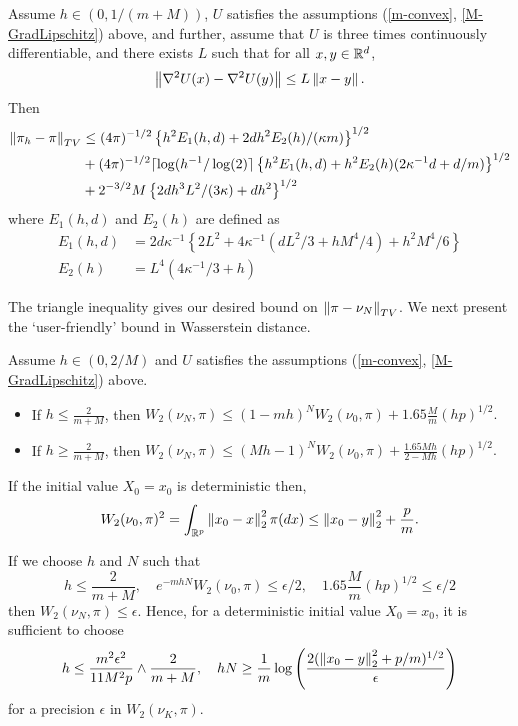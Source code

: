 \begin{theorem}
    Assume $h \in (0, 1/(m+M))$, $U$ satisfies the assumptions (\ref{m-convex}, \ref{M-GradLipschitz}) above, and further, assume that $U$ is three times continuously differentiable, and there exists $L$ such that for all $x,y \in \mathbb{R}^d$,
    $$
    \norm{\grad^2 U(x) - \grad^2 U(y)} \leq L \norm{x-y}.
    $$
    Then
    \begin{align*}
        \norm{\pi_h - \pi}_{TV} &\leq (4 \pi)^{-1/2} \left\{ h^2 E_1(h, d) + 2dh^2 E_2(h)/(\kappa m)\right\}^{1/2}\\
        &+ (4 \pi)^{-1/2} \lceil \log(h^{-1}/\log(2) \rceil \left\{ h^2 E_1(h,d) + h^2 E_2(h)(2 \kappa^{-1}d + d/m) \right\}^{1/2}\\
        &+ 2^{-3/2} M \left\{ 2d h^3 L^2/(3\kappa) + dh^2\right\}^{1/2}
    \end{align*}
    where $E_1(h,d)$ and $E_2(h)$ are defined as
    \begin{align*}
        E_1(h,d) &= 2 d \kappa^{-1} \left\{2L^2 + 4 \kappa^{-1} (dL^2/3 + h M^4 /4) + h^2 M^4/6 \right\}\\
        E_2(h) &= L^4(4\kappa^{-1}/3 + h)
    \end{align*}
\end{theorem}

The triangle inequality gives our desired bound on $\norm{\pi - \nu_N}_{TV}$.  We next present the `user-friendly' bound in Wasserstein distance.

\begin{theorem}
    Assume $h \in (0, 2/M)$ and $U$ satisfies the assumptions (\ref{m-convex}, \ref{M-GradLipschitz}) above. 
    \begin{itemize}
        \item If $h \leq \frac{2}{m+M}$, then $W_2(\nu_N, \pi) \leq (1-mh)^N W_2(\nu_0, \pi) + 1.65 \frac{M}{m}(hp)^{1/2}.$
        \item If $h \geq \frac{2}{m+M}$, then $W_2(\nu_N, \pi) \leq (Mh-1)^N W_2(\nu_0, \pi) + \frac{1.65Mh}{2-Mh}(hp)^{1/2}.$
\end{itemize}
\end{theorem}
\begin{prop}
    If the initial value $X_0 = x_0$ is deterministic then,
    $$
    W_2(\nu_0, \pi)^2 = \int_{\R^p} \norm{x_0-x}_2^2 \pi(dx) \leq \norm{x_0-y}_2^2 + \frac{p}{m}.
    $$
\end{prop}

\begin{remark}
    If we choose $h$ and $N$ such that
    $$
    h \leq \frac{2}{m+M}, \quad e^{-mhN}W_2(\nu_0, \pi) \leq \epsilon/2, \quad 1.65\frac{M}{m}(hp)^{1/2} \leq \epsilon/2
    $$
    then $W_2(\nu_N,\pi) \leq \epsilon$.  Hence, for a deterministic initial value $X_0=x_0$, it is sufficient to choose
    $$
    h \leq \frac{m^2 \epsilon^2}{11M^2p} \wedge \frac{2}{m+M}, \quad hN \geq \frac{1}{m} \log \left( \frac{2(\norm{x_0-y}_2^2+p/m)^{1/2}}{\epsilon} \right)
    $$
    for a precision $\epsilon$ in $W_2(\nu_K, \pi)$.
\end{remark}


